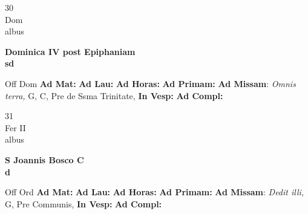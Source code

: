 \documentclass[10pt, openany]{book}
\begin{document}
    \begin{center}
        \begin{minipage}{3.5in}
            \vspace{2em}
            \begin{minipage}{0.5in}
                {\Huge 30} \\
                {\normalsize Dom} \\
                {\normalsize albus}
            \end{minipage}
            \begin{minipage}{3.0in}
                \textbf{ \large Dominica IV post Epiphaniam \\
                \textnormal{\normalsize sd}} \\ 
            \end{minipage}
            \begin{justify}Off Dom
                \textbf{Ad Mat: }
                \textbf{Ad Lau: }
                \textbf{Ad Horas: }
                \textbf{Ad Primam: }\textbf{Ad Missam}: \textit{Omnis terra,} G, C, Pre de Ssma Trinitate,  
                \textbf{In Vesp: }
                \textbf{Ad Compl: }
            \end{justify}
        \end{minipage}
    \end{center}

    \begin{center}
        \begin{minipage}{3.5in}
            \vspace{2em}
            \begin{minipage}{0.5in}
                {\Huge 31} \\
                {\normalsize Fer II} \\
                {\normalsize albus}
            \end{minipage}
            \begin{minipage}{3.0in}
                \textbf{ \large S Joannis Bosco C \\
                \textnormal{\normalsize d}} \\ 
            \end{minipage}
            \begin{justify}Off Ord
                \textbf{Ad Mat: }
                \textbf{Ad Lau: }
                \textbf{Ad Horas: }
                \textbf{Ad Primam: }\textbf{Ad Missam}: \textit{Dedit illi,} G, Pre Communis,  
                \textbf{In Vesp: }
                \textbf{Ad Compl: }
            \end{justify}
        \end{minipage}
    \end{center}
\end{document}
